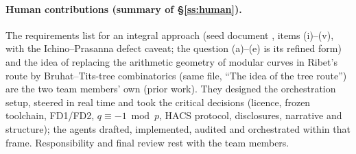 \paragraph{Human contributions (summary of \S\ref{ss:human}).} The requirements list for an integral approach (seed document
, items (i)--(v), with the Ichino--Prasanna defect caveat; the question (a)--(e)
is its refined form) and the idea of replacing the arithmetic geometry of modular curves in Ribet's route by
Bruhat--Tits-tree combinatorics (same file, ``The idea of the tree route'') are the two team members' own (prior work). They designed the orchestration setup, steered in real time and took the critical
decisions (licence, frozen toolchain, FD1/FD2, $q\equiv-1\bmod p$, HACS protocol, disclosures, narrative and structure); the
agents drafted, implemented, audited and orchestrated within that frame. Responsibility and final review rest with the team members.


